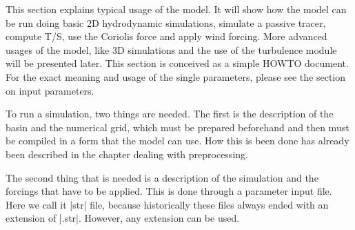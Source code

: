 
This section explains typical usage of the model. It will show how
the model can be run doing basic 2D hydrodynamic simulations, simulate
a passive tracer, compute T/S, use the Coriolis force and apply wind
forcing. More advanced usages of the model, like 3D simulations and the
use of the turbulence module will be presented later. This section is
conceived as a simple HOWTO document. For the exact meaning and usage
of the single parameters, please see the section on input parameters.

To run a simulation, two things are needed. The first is the description
of the basin and the numerical grid, which must be prepared beforehand and
then must be compiled in a form that the model can use. How this is been
done has already been described in the chapter dealing with preprocessing.

The second thing that is needed is a description of the simulation and the
forcings that have to be applied. This is done through a parameter input
file. Here we call it |str| file, because historically these files always
ended with an extension of |.str|. However, any extension can be used.

